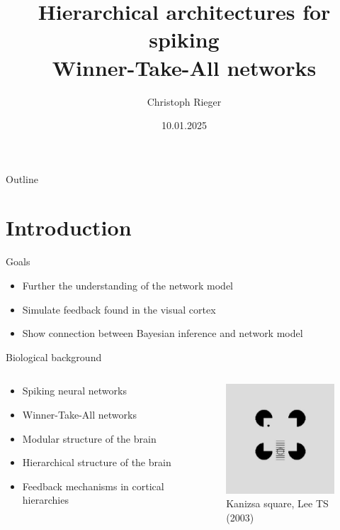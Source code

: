 \documentclass[aspectratio=169]{beamer}
\title[Short Title]{ Hierarchical architectures for spiking \\ Winner-Take-All networks}
\author{Christoph Rieger}
\date{10.01.2025}
\institute{IML}
\begin{document}
\begin{frame}[plain]
  \maketitle
\end{frame}


\begin{frame}{Outline}
  \tableofcontents
\end{frame}


\section{Introduction}

\begin{frame}{Goals}
  \begin{itemize}
    \item Further the understanding of the network model
    \item Simulate feedback found in the visual cortex
    \item Show connection between Bayesian inference and network model
  \end{itemize}
\end{frame}

\begin{frame}{Biological background}
  \begin{columns}[onlytextwidth]
	\begin{column}{0.5\textwidth}
	\vspace{-1.0cm}
      \begin{itemize}
        \item Spiking neural networks 
        \item Winner-Take-All networks 
        \item Modular structure of the brain
        \item Hierarchical structure of the brain
        \item Feedback mechanisms in cortical hierarchies
      \end{itemize}
	\end{column}
	\begin{column}{0.5\textwidth}
      \begin{figure}
        \includegraphics[width=0.4\linewidth]{../Latex/figures/kanizsaSquare.PNG}
      \\   \footnotesize Kanizsa square, Lee TS (2003)
      \end{figure} 
  	\end{column}
  \end{columns}
\end{frame}
\end{document}
